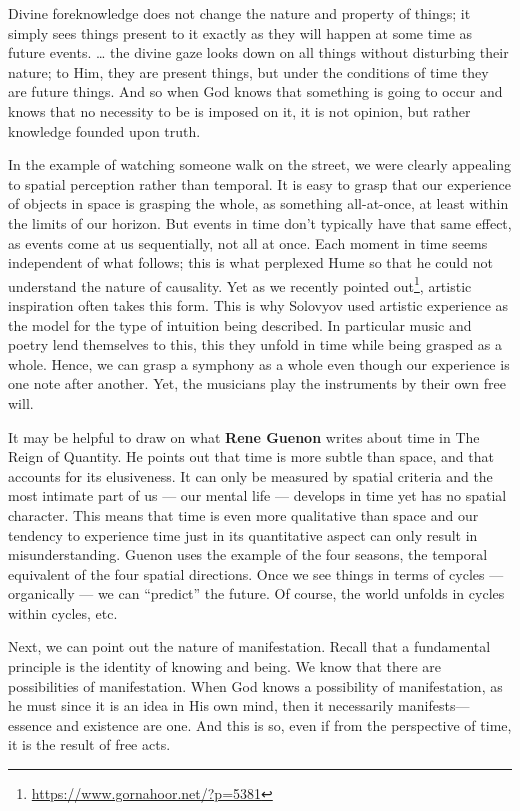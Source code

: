 \begin{quotex}
Divine foreknowledge does not change the nature and property of things; it simply sees things present to it exactly as they will happen at some time as future events. … the divine gaze looks down on all things without disturbing their nature; to Him, they are present things, but under the conditions of time they are future things. And so when God knows that something is going to occur and knows that no necessity to be is imposed on it, it is not opinion, but rather knowledge founded upon truth. 

\end{quotex}
In the example of watching someone walk on the street, we were clearly appealing to spatial perception rather than temporal. It is easy to grasp that our experience of objects in space is grasping the whole, as something all-at-once, at least within the limits of our horizon. But events in time don't typically have that same effect, as events come at us sequentially, not all at once. Each moment in time seems independent of what follows; this is what perplexed Hume so that he could not understand the nature of causality. Yet as we recently pointed out\footnote{\url{https://www.gornahoor.net/?p=5381}}, artistic inspiration often takes this form. This is why Solovyov used artistic experience as the model for the type of intuition being described. In particular music and poetry lend themselves to this, this they unfold in time while being grasped as a whole. Hence, we can grasp a symphony as a whole even though our experience is one note after another. Yet, the musicians play the instruments by their own free will.

It may be helpful to draw on what \textbf{Rene Guenon} writes about time in The Reign of Quantity. He points out that time is more subtle than space, and that accounts for its elusiveness. It can only be measured by spatial criteria and the most intimate part of us — our mental life — develops in time yet has no spatial character. This means that time is even more qualitative than space and our tendency to experience time just in its quantitative aspect can only result in misunderstanding. Guenon uses the example of the four seasons, the temporal equivalent of the four spatial directions. Once we see things in terms of cycles — organically — we can “predict” the future. Of course, the world unfolds in cycles within cycles, etc.

Next, we can point out the nature of manifestation. Recall that a fundamental principle is the identity of knowing and being. We know that there are possibilities of manifestation. When God knows a possibility of manifestation, as he must since it is an idea in His own mind, then it necessarily manifests—essence and existence are one. And this is so, even if from the perspective of time, it is the result of free acts.

